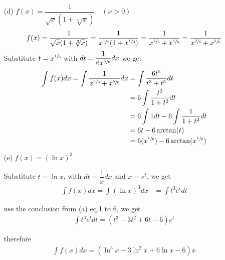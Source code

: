 \documentclass[11pt,a4paper]{article}
\renewcommand{\frac}{\dfrac}
\begin{document}
\begin{enumerate}
\item[(d)]$f(x)=\frac{1}{\sqrt{x}(1+\sqrt[3]{x})} \hspace{1em} (x>0)$
\begin{align}
f(x)
=\frac{1}{\sqrt{x}(1+\sqrt[3]{x})}
=\frac{1}{x^{\sfrac{1}{2}}(1+x^{\sfrac{1}{3}})}
=\frac{1}{x^{\sfrac{1}{2}}+x^{\sfrac{5}{6}}}
=\frac{1}{x^{\sfrac{3}{6}}+x^{\sfrac{5}{6}}}
\end{align}
Substitute $t=x^{\sfrac{1}{6}}$ with $dt=\frac{1}{6x^{\sfrac{5}{6}}}dx$ we get
\begin{align}
\int f(x)dx=\int\frac{1}{x^{\sfrac{3}{6}}+x^{\sfrac{5}{6}}}dx
&=\int\frac{6t^5}{t^3+t^5}dt \\
&=6\int\frac{t^2}{1+t^2}dt \\
&=6\int 1dt-6\int\frac{1}{1+t^2}dt \\
&=6t-6\arctan(t) \\
&=6(x^{\sfrac{1}{6}})-6\arctan(x^{\sfrac{1}{6}})
\end{align}

\item[(e)]$f(x)=(\ln x)^3$

Substitute $t=\ln x$, with $dt=\frac{1}{x}dx$ and $x=e^t$, we get
\begin{align}
\int f(x)dx=\int (\ln x)^3 dx
&=\int t^3 e^t dt
\end{align}

use the conclusion from (a) eq.1 to 6, we get
\begin{align}
\int t^3 e^t dt=(t^3-3t^2+6t-6)e^t
\end{align}

therefore
\begin{align}
\int f(x)dx=(\ln^3 x-3\ln^2 x+6\ln x-6)x
\end{align}

\end{enumerate}
\end{document}
